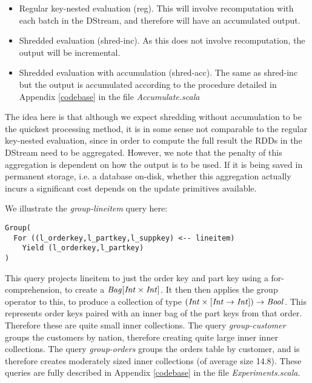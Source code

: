 \begin{itemize}
\item{Regular key-nested evaluation (reg). This will involve recomputation with each batch in the DStream, and therefore will have an accumulated output.}
\item{Shredded evaluation (shred-inc). As this does not involve recomputation, the output will be incremental.}
\item{Shredded evaluation with accumulation (shred-acc). The same as shred-inc but the output is accumulated according to the procedure detailed in Appendix \ref{codebase} in the file \textit{Accumulate.scala}}
\end{itemize}

The idea here is that although we expect shredding without accumulation to be the quickest processing method, it is in some sense not comparable to the regular key-nested evaluation, since in order to compute the full result the RDDs in the DStream need to be aggregated. However, we note that the penalty of this aggregation is dependent on how the output is to be used. If it is being saved in permanent storage, i.e. a database on-disk, whether this aggregation actually incurs a significant cost depends on the update primitives available.

We illustrate the \textit{group-lineitem} query here:
\vs\begin{lstlisting}
Group(
  For ((l_orderkey,l_partkey,l_suppkey) <-- lineitem)
    Yield (l_orderkey,l_partkey)
)
\end{lstlisting}\vs

This query projects lineitem to just the order key and part key using a for-comprehension, to create a $\textrm{\textit{Bag}}[\textrm{\textit{Int}} \times \textrm{\textit{Int}}]$. It then then applies the group operator to this, to produce a collection of type $(\textrm{\textit{Int}} \times [\textrm{\textit{Int}} \rightarrow \textrm{\textit{Int}}]) \rightarrow \textrm{\textit{Bool}}$. This represents order keys paired with an inner bag of the part keys from that order. Therefore these are quite small inner collections.
The query \textit{group-customer} groups the customers by nation, therefore creating quite large inner inner collections. The query \textit{group-orders} groups the orders table by customer, and is therefore creates moderately sized inner collections (of average size 14.8). These queries are fully described in Appendix \ref{codebase} in the file \textit{Experiments.scala}.

